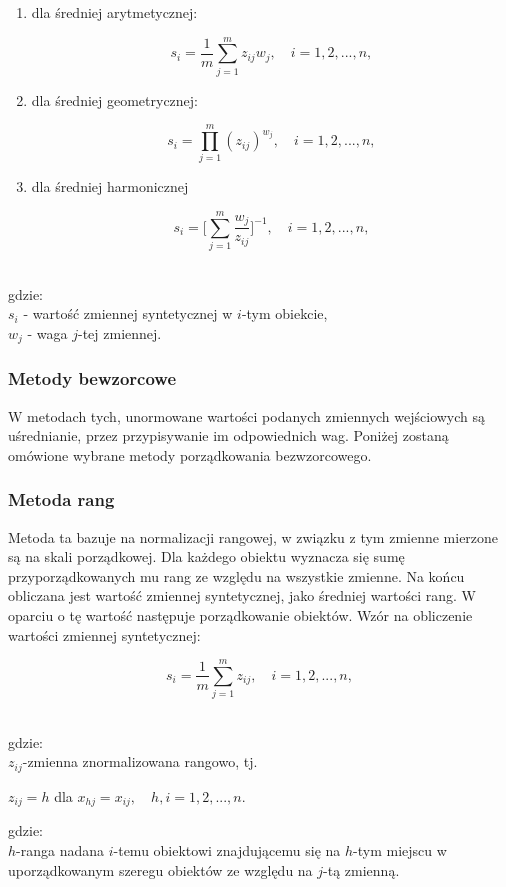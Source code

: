 \documentclass[12pt,a4paper]{report}
\begin{document}
\begin{enumerate}
\item dla średniej arytmetycznej:
\begin{center}
$$s_{i}=\frac{1}{m} \sum_{j=1}^{m} z_{ij}w_{j},  \quad i=1, 2, ..., n,$$
\end{center}
\item dla średniej geometrycznej:
\begin{center}
$$s_{i}=\prod_{j=1}^{m} (z_{ij})^{w_{j}}, \quad i=1, 2, ..., n,$$
\end{center}
\item dla średniej harmonicznej
\begin{center}
$$s_{i}=\big[\sum_{j=1}^{m} \frac{w_{j}}{z_{ij}}\big]^{-1}, \quad i=1, 2, ..., n,$$\\
\end{center}
\end{enumerate}
gdzie:\\
$s_{i}$ - wartość zmiennej syntetycznej w $i$-tym obiekcie,\\
$w_{j}$ - waga $j$-tej zmiennej.

\subsubsection{Metody bewzorcowe}
\noindent

W metodach tych, unormowane wartości podanych zmiennych wejściowych są uśrednianie, przez przypisywanie im odpowiednich wag. 
Poniżej zostaną omówione wybrane metody porządkowania bezwzorcowego.

\subsubsection{Metoda rang}
\noindent


Metoda ta bazuje na normalizacji rangowej, w związku z tym zmienne mierzone są na skali porządkowej. Dla każdego obiektu wyznacza się sumę przyporządkowanych mu rang ze względu na wszystkie zmienne. Na końcu obliczana jest wartość zmiennej syntetycznej, jako średniej wartości rang. W oparciu o tę wartość następuje porządkowanie obiektów. Wzór na obliczenie wartości zmiennej syntetycznej: 
\begin{center}
$$s_{i}=\frac{1}{m}\sum_{j=1}^{m} z_{ij},\quad i=1, 2, ..., n,$$\\
\end{center}
gdzie:\\
$z_{ij}$-zmienna znormalizowana rangowo, tj.
\begin{center}
$z_{ij}=h$ dla $x_{hj}=x_{ij}, \quad h,i=1, 2, ..., n.$
\end{center}
gdzie:\\
$h$-ranga nadana $i$-temu obiektowi znajdującemu się na $h$-tym miejscu w uporządkowanym szeregu obiektów ze względu na $j$-tą zmienną.
\end{document}

